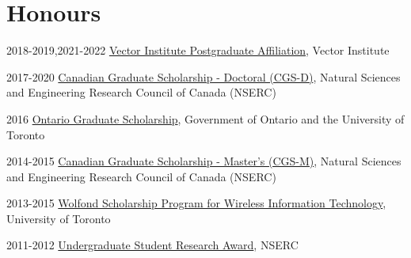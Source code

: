\documentclass{article}
\begin{document}
\section{Honours}
\begin{CV}
  
  \item[2018-2019,2021-2022] \href{hhttps://vectorinstitute.ai/2021/03/31/vector-welcomes-new-researchers-to-postgraduate-affiliate-program/}
    {Vector Institute Postgraduate Affiliation}, Vector Institute

  \item[2017-2020] \href{http://www.nserc-crsng.gc.ca/Students-Etudiants/PG-CS/BellandPostgrad-BelletSuperieures_eng.asp}
    {Canadian Graduate Scholarship - Doctoral (CGS-D)}, Natural Sciences and
    Engineering Research Council of Canada (NSERC)

  \item[2016] \href{https://osap.gov.on.ca/OSAPPortal/en/A-ZListofAid/PRDR013089.html}
    {Ontario Graduate Scholarship}, Government of Ontario and the University of
    Toronto

  \item[2014-2015] \href{http://www.nserc-crsng.gc.ca/Students-Etudiants/PG-CS/CGSM-BESCM_eng.asp}
    {Canadian Graduate Scholarship - Master's (CGS-M)}, Natural Sciences and
    Engineering Research Council of Canada (NSERC)

  \item[2013-2015] \href{http://www.artsci.utoronto.ca/graduate/scholarships-awards/scholarships-by-department/computer-science}
    {Wolfond Scholarship Program for Wireless Information Technology},
    University of Toronto

  \item[2011-2012] \href{http://www.nserc-crsng.gc.ca/Students-Etudiants/UG-PC/USRA-BRPC_eng.asp}
    {Undergraduate Student Research Award}, NSERC

\end{CV}
\end{document}
